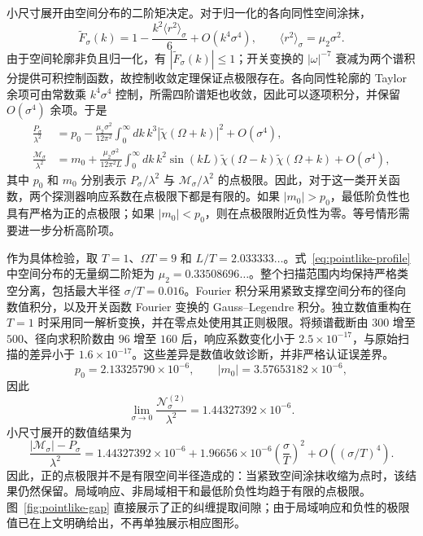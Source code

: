 \documentclass[UTF8,11pt,a4paper,fontset=none]{ctexart}
\begin{document}
小尺寸展开由空间分布的二阶矩决定。对于归一化的各向同性空间涂抹，
\begin{equation}
\widetilde F_\sigma(k)
=1-\frac{k^2\langle r^2\rangle_\sigma}{6}
+O(k^4\sigma^4),\qquad
\langle r^2\rangle_\sigma=\mu_2\sigma^2.
\label{eq:profile-moment-expansion}
\end{equation}
由于空间轮廓非负且归一化，有 $|\widetilde F_\sigma(k)|\leq1$；开关变换的 $|\omega|^{-7}$ 衰减为两个谱积分提供可积控制函数，故控制收敛定理保证点极限存在。各向同性轮廓的 Taylor 余项可由常数乘 $k^4\sigma^4$ 控制，所需四阶谱矩也收敛，因此可以逐项积分，并保留 $O(\sigma^4)$ 余项。于是
\begin{align}
\frac{P_\sigma}{\lambda^2}
&=p_0-\frac{\mu_2\sigma^2}{12\pi^2}
\int_0^\infty dk\,k^3|\widetilde\chi(\Omega+k)|^2
+O(\sigma^4),
\label{eq:pointlike-P-expansion}\\
\frac{\mathcal M_\sigma}{\lambda^2}
&=m_0+\frac{\mu_2\sigma^2}{12\pi^2L}
\int_0^\infty dk\,k^2\sin(kL)
\widetilde\chi(\Omega-k)\widetilde\chi(\Omega+k)
+O(\sigma^4),
\label{eq:pointlike-M-expansion}
\end{align}
其中 $p_0$ 和 $m_0$ 分别表示 $P_\sigma/\lambda^2$ 与 $\mathcal M_\sigma/\lambda^2$ 的点极限。因此，对于这一类开关函数，两个探测器响应系数在点极限下都是有限的。如果 $|m_0|>p_0$，最低阶负性也具有严格为正的点极限；如果 $|m_0|<p_0$，则在点极限附近负性为零。等号情形需要进一步分析高阶项。

作为具体检验，取 $T=1$、$\Omega T=9$ 和 $L/T=2.033333\ldots$。式~\eqref{eq:pointlike-profile} 中空间分布的无量纲二阶矩为 $\mu_2=0.33508696\ldots$。整个扫描范围内均保持严格类空分离，包括最大半径 $\sigma/T=0.016$。Fourier 积分采用紧致支撑空间分布的径向数值积分，以及开关函数 Fourier 变换的 Gauss--Legendre 积分。独立数值重构在 $T=1$ 时采用同一解析变换，并在零点处使用其正则极限。将频谱截断由 $300$ 增至 $500$、径向求积阶数由 $96$ 增至 $160$ 后，响应系数变化小于 $2.5\times10^{-17}$，与原始扫描的差异小于 $1.6\times10^{-17}$。这些差异是数值收敛诊断，并非严格认证误差界。
\begin{equation}
p_0=2.13325790\times10^{-6},\qquad
|m_0|=3.57653182\times10^{-6},
\label{eq:pointlike-limits-numbers}
\end{equation}
因此
\begin{equation}
\lim_{\sigma\to0}\frac{\mathcal N_\sigma^{(2)}}{\lambda^2}
=1.44327392\times10^{-6}.
\label{eq:pointlike-negativity-limit}
\end{equation}
小尺寸展开的数值结果为
\begin{equation}
\frac{|\mathcal M_\sigma|-P_\sigma}{\lambda^2}
=1.44327392\times10^{-6}
+1.96656\times10^{-6}\left(\frac{\sigma}{T}\right)^2
+O\!\left((\sigma/T)^4\right).
\label{eq:pointlike-gap-fit}
\end{equation}
因此，正的点极限并不是有限空间半径造成的：当紧致空间涂抹收缩为点时，该结果仍然保留。局域响应、非局域相干和最低阶负性均趋于有限的点极限。图~\ref{fig:pointlike-gap} 直接展示了正的纠缠提取间隙；由于局域响应和负性的极限值已在上文明确给出，不再单独展示相应图形。
\end{document}
